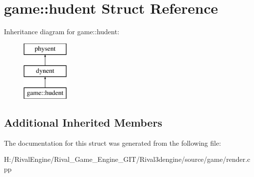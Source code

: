 \hypertarget{structgame_1_1hudent}{}\section{game\+:\+:hudent Struct Reference}
\label{structgame_1_1hudent}
Inheritance diagram for game\+:\+:hudent\+:\begin{figure}[H]
\begin{center}
\leavevmode
\includegraphics[height=3.000000cm]{structgame_1_1hudent}
\end{center}
\end{figure}
\subsection*{Additional Inherited Members}


The documentation for this struct was generated from the following file\+:\begin{DoxyCompactItemize}
\item 
H\+:/\+Rival\+Engine/\+Rival\+\_\+\+Game\+\_\+\+Engine\+\_\+\+G\+I\+T/\+Rival3dengine/source/game/render.\+cpp\end{DoxyCompactItemize}
